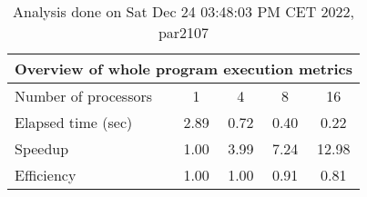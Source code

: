 \begin{table}[h]
\begin{center}
\begin{tabular}{|l|c|c|c|c|}
\hline
\multicolumn{5}{|c|}{Overview of whole program execution metrics} \\
\hline
\hline
Number of processors & 1 & 4 & 8 & 16 \\
\hline
Elapsed time (sec)      &       2.89 &       0.72 &       0.40 &       0.22 \\
\hline
Speedup                 &       1.00 &       3.99 &       7.24 &      12.98 \\
\hline
Efficiency              &       1.00 &       1.00 &       0.91 &       0.81 \\
\hline
\end{tabular}
\end{center}
\caption{ Analysis done on Sat Dec 24 03:48:03 PM CET 2022, par2107}
\end{table}
